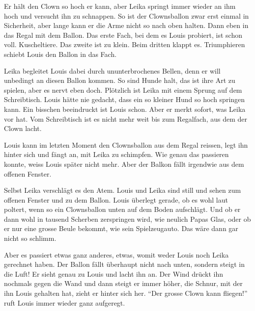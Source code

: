Er hält den Clown so hoch er kann, aber Leika springt immer wieder an ihm hoch und versucht ihn zu schnappen. So ist der Clownsballon zwar erst einmal in Sicherheit, aber lange kann er die Arme nicht so nach oben halten. Dann eben in das Regal mit dem Ballon. Das erste Fach, bei dem es Louis probiert, ist schon voll. Kuscheltiere. Das zweite ist zu klein. Beim dritten klappt es. Triumphieren schiebt Louis den Ballon in das Fach.

Leika begleitet Louis dabei durch ununterbrochenes Bellen, denn er will unbedingt an diesen Ballon kommen. So sind Hunde halt, das ist ihre Art zu spielen, aber es nervt eben doch. Plötzlich ist Leika mit einem Sprung auf dem Schreibtisch. Louis hätte nie gedacht, dass ein so kleiner Hund so hoch springen kann. Ein bisschen beeindruckt ist Louis schon. Aber er merkt sofort, was Leika vor hat. Vom Schreibtisch ist es nicht mehr weit bis zum Regalfach, aus dem der Clown lacht. 

Louis kann im letzten Moment den Clownsballon aus dem Regal reissen, legt ihn hinter sich und fängt an, mit Leika zu schimpfen. Wie genau das passieren konnte, weiss Louis später nicht mehr. Aber der Balkon fällt irgendwie aus dem offenen Fenster.

Selbst Leika verschlägt es den Atem. Louis und Leika sind still und sehen zum offenen Fenster und zu dem Ballon. Louis überlegt gerade, ob es wohl laut poltert, wenn so ein Clownsballon unten auf dem Boden aufschlägt. Und ob er dann wohl in tausend Scherben zerspringen wird, wie neulich Papas Glas, oder ob er nur eine grosse Beule bekommt, wie sein Spielzeugauto. Das wäre dann gar nicht so schlimm.

Aber es passiert etwas ganz anderes, etwas, womit weder Louis noch Leika gerechnet haben. Der Ballon fällt überhaupt nicht nach unten, sondern steigt in die Luft! Er sieht genau zu Louis und lacht ihn an. Der Wind drückt ihn nochmals gegen die Wand und dann steigt er immer höher, die Schnur, mit der ihn Louis gehalten hat, zieht er hinter sich her.
\enquote{Der grosse Clown kann fliegen!} ruft Louis immer wieder ganz aufgeregt.

